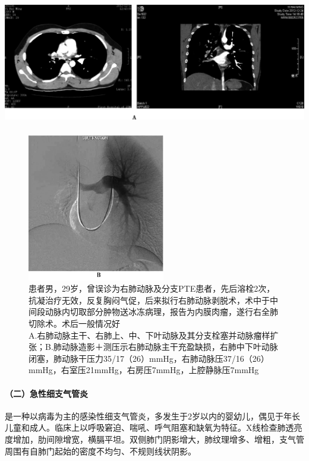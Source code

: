 \includegraphics[width=5.54167in,height=2.15625in]{./images/Image00055.jpg}

\begin{figure}[!htbp]
 \centering
 \includegraphics[width=2.36458in,height=2.55208in]{./images/Image00056.jpg}
 \caption{患者男，29岁，曾误诊为右肺动脉及分支PTE患者，先后溶栓2次，抗凝治疗无效，反复胸闷气促，后来拟行右肺动脉剥脱术，术中于中间段动脉内切取部分肿物送冰冻病理，报告为内膜肉瘤，遂行右全肺切除术。术后一般情况好\\ A.右肺动脉主干、右肺上、中、下叶动脉及其分支栓塞并动脉瘤样扩张；B.肺动脉造影＋测压示右肺动脉主干充盈缺损，右肺中下叶动脉闭塞，肺动脉干压力35/17（26）mmHg，右肺动脉压37/16（26）mmHg，右室压21mmHg，右房压7mmHg，上腔静脉压7mmHg}
 \label{fig7-4}
  \end{figure} 



\paragraph{（二）急性细支气管炎}

是一种以病毒为主的感染性细支气管炎，多发生于2岁以内的婴幼儿，偶见于年长儿童和成人。临床上以呼吸窘迫、喘吼、呼气阻塞和缺氧为特征。X线检查肺透亮度增加，肋间隙增宽，横膈平坦。双侧肺门阴影增大，肺纹理增多、增粗，支气管周围有自肺门起始的密度不均匀、不规则线状阴影。


